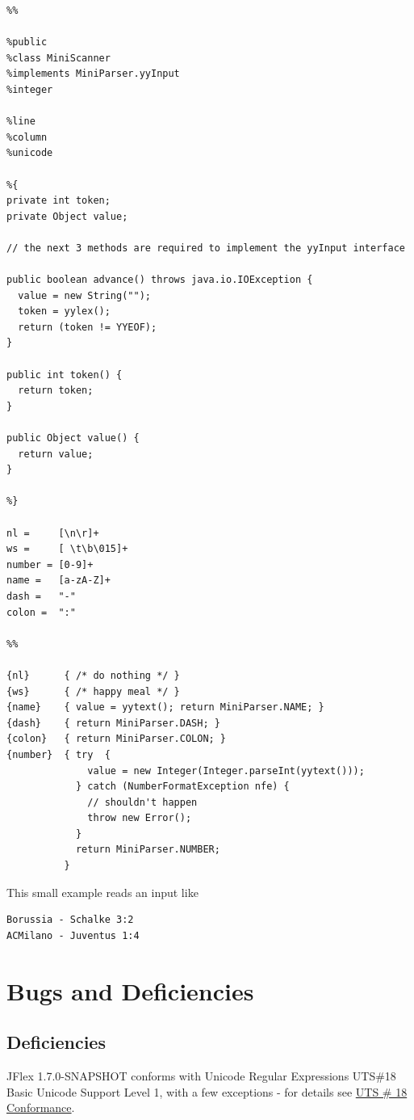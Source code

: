 \begin{verbatim}
%%

%public
%class MiniScanner
%implements MiniParser.yyInput
%integer

%line
%column
%unicode

%{
private int token;
private Object value;

// the next 3 methods are required to implement the yyInput interface

public boolean advance() throws java.io.IOException {
  value = new String("");
  token = yylex();
  return (token != YYEOF);
}

public int token() {
  return token;
}

public Object value() {
  return value;
}

%}

nl =     [\n\r]+
ws =     [ \t\b\015]+
number = [0-9]+
name =   [a-zA-Z]+
dash =   "-"
colon =  ":"

%%

{nl}      { /* do nothing */ }
{ws}      { /* happy meal */ }
{name}    { value = yytext(); return MiniParser.NAME; }
{dash}    { return MiniParser.DASH; }
{colon}   { return MiniParser.COLON; }
{number}  { try  {
              value = new Integer(Integer.parseInt(yytext()));
            } catch (NumberFormatException nfe) {
              // shouldn't happen
              throw new Error();
            }
            return MiniParser.NUMBER;
          }
\end{verbatim}

This small example reads an input like

\begin{verbatim}
Borussia - Schalke 3:2
ACMilano - Juventus 1:4
\end{verbatim}

\section{Bugs and Deficiencies}\label{Bugs}

\subsection{Deficiencies}\label{deficiencies}

JFlex 1.7.0-SNAPSHOT conforms with Unicode Regular Expressions UTS\#18
\autocite{unicode_rep} Basic Unicode Support Level 1, with a few
exceptions - for details see \hyperref[unicoderegexconformance]{UTS \#
18 Conformance}.

